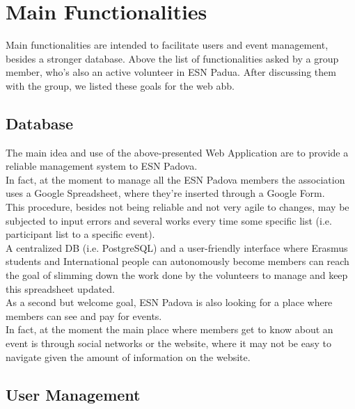 \section{Main Functionalities}

Main functionalities are intended to facilitate users and event management, besides a stronger database.
Above the list of functionalities asked by a group member, who's also an active volunteer in ESN Padua.
After discussing them  with the group, we listed these goals for the web abb.

\subsection{Database}
The main idea and use of the above-presented Web Application are to provide a reliable management system to ESN Padova. \\
In fact, at the moment to manage all the ESN Padova members the association uses a Google Spreadsheet, where they're inserted 
through a Google Form. \\
This procedure, besides not being reliable and not very agile to changes, may be subjected to input errors and several works 
every time some specific list (i.e. participant list to a specific event).\\
A centralized DB (i.e. PostgreSQL) and a user-friendly interface where Erasmus students and International people can autonomously 
become members can reach the goal of slimming down the work done by the volunteers to manage and keep this spreadsheet updated.\\
As a second but welcome goal, ESN Padova is also looking for a place where members can see and pay for events.\\
In fact, at the moment the main place where members get to know about an event is through social networks or the website, where it
may not be easy to navigate given the amount of information on the website.
\subsection{User Management}

